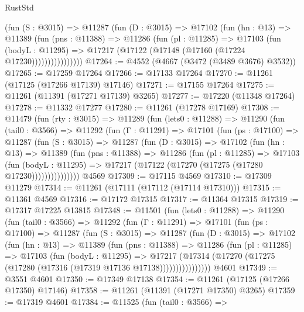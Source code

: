 \begin{lexlean}{RustStd}
\begin{coremodule}
                (fun (S : @3015) =>
                @11287
                  (fun (D : @3015) =>
                  @17102
                    (fun (hn : @13) =>
                    @11389
                      (fun (pns : @11388) =>
                      @11286
                        (fun (pl : @11285) =>
                        @17103
                          (fun (bodyL : @11295) =>
                          @17217 (@17122 (@17148 (@17160 (@17224 @17230))))))))))))))))
@17264 := @4552 (@4667 (@3472 (@3489 @3676) @3532))
@17265 := @17259 @17264
@17266 := @17133 @17264
@17270 := @11261 (@17125 (@17266 @17139) @17146)
@17271 := @17155 @17264
@17275 := @11261 (@11391 (@17271 @17139) @3265)
@17277 := @17220 (@11348 @17264)
@17278 := @11332 @17277
@17280 := @11261 (@17278 @17169)
@17308 := @11479
    (fun (rty : @3015) =>
    @11289
      (fun (lets0 : @11288) =>
      @11290
        (fun (tail0 : @3566) =>
        @11292
          (fun (Γ : @11291) =>
          @17101
            (fun (ps : @17100) =>
            @11287
              (fun (S : @3015) =>
              @11287
                (fun (D : @3015) =>
                @17102
                  (fun (hn : @13) =>
                  @11389
                    (fun (pns : @11388) =>
                    @11286
                      (fun (pl : @11285) =>
                      @17103
                        (fun (bodyL : @11295) =>
                        @17217 (@17122 (@17270 (@17275 (@17280 @17230)))))))))))))))
    @4569
@17309 := @17115 @4569
@17310 := @17309 @11279
@17314 := @11261 (@17111 (@17112 (@17114 @17310)))
@17315 := @11361 @4569
@17316 := @17172 @17315
@17317 := @11364 @17315
@17319 := @17317 @17225 @13815
@17348 := @11501
    (fun (lets0 : @11288) =>
    @11290
      (fun (tail0 : @3566) =>
      @11292
        (fun (Γ : @11291) =>
        @17101
          (fun (ps : @17100) =>
          @11287
            (fun (S : @3015) =>
            @11287
              (fun (D : @3015) =>
              @17102
                (fun (hn : @13) =>
                @11389
                  (fun (pns : @11388) =>
                  @11286
                    (fun (pl : @11285) =>
                    @17103
                      (fun (bodyL : @11295) =>
                      @17217
                        (@17314
                          (@17270 (@17275 (@17280 (@17316 (@17319 @17136 @17138))))))))))))))))
    @4601
@17349 := @3551 @4601
@17350 := @17349 @17138
@17354 := @11261 (@17125 (@17266 @17350) @17146)
@17358 := @11261 (@11391 (@17271 @17350) @3265)
@17359 := @17319 @4601
@17384 := @11525
    (fun (tail0 : @3566) =>

\end{coremodule}
\end{lexlean}

